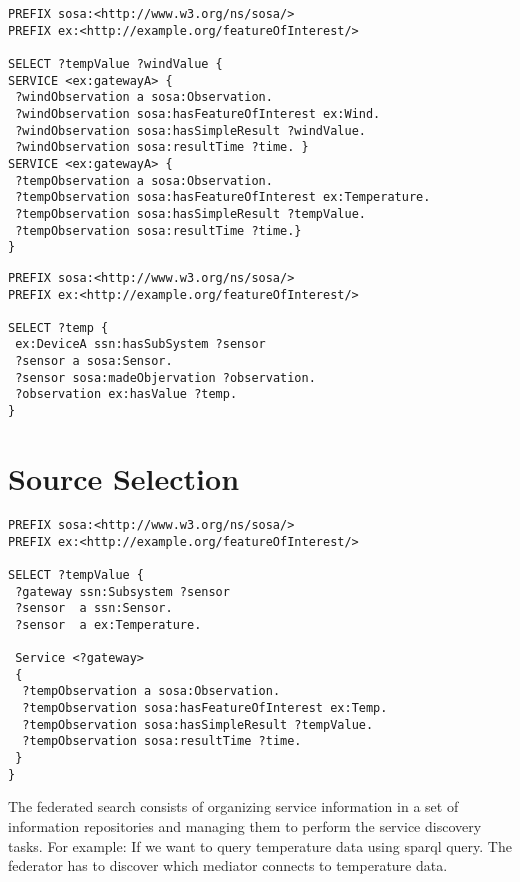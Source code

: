 \begin{lstlisting}[language=sparql,
  				   captionpos=b,
                   label={lst:TDexample},
                   caption={Federated SPARQL}]
PREFIX sosa:<http://www.w3.org/ns/sosa/>                   
PREFIX ex:<http://example.org/featureOfInterest/>  

SELECT ?tempValue ?windValue {
SERVICE <ex:gatewayA> {
 ?windObservation a sosa:Observation. 
 ?windObservation sosa:hasFeatureOfInterest ex:Wind.
 ?windObservation sosa:hasSimpleResult ?windValue.
 ?windObservation sosa:resultTime ?time. }
SERVICE <ex:gatewayA> {
 ?tempObservation a sosa:Observation.
 ?tempObservation sosa:hasFeatureOfInterest ex:Temperature.
 ?tempObservation sosa:hasSimpleResult ?tempValue.
 ?tempObservation sosa:resultTime ?time.}
}
\end{lstlisting}

\begin{lstlisting}[language=sparql,
  				   captionpos=b,
                   label={lst:TDexample},
                   caption={Federated SPARQL}]
PREFIX sosa:<http://www.w3.org/ns/sosa/>                   
PREFIX ex:<http://example.org/featureOfInterest/>  

SELECT ?temp {
 ex:DeviceA ssn:hasSubSystem ?sensor
 ?sensor a sosa:Sensor.
 ?sensor sosa:madeObjervation ?observation.
 ?observation ex:hasValue ?temp.
}
\end{lstlisting}


\section{Source Selection}


\begin{lstlisting}[language=sparql,
  				   captionpos=b,
                   label={lst:TDexample},
                   caption={Federated SPARQL}]
PREFIX sosa:<http://www.w3.org/ns/sosa/>                   
PREFIX ex:<http://example.org/featureOfInterest/>  

SELECT ?tempValue {
 ?gateway ssn:Subsystem ?sensor
 ?sensor  a ssn:Sensor.
 ?sensor  a ex:Temperature.
 
 Service <?gateway>
 {
  ?tempObservation a sosa:Observation.
  ?tempObservation sosa:hasFeatureOfInterest ex:Temp.
  ?tempObservation sosa:hasSimpleResult ?tempValue.
  ?tempObservation sosa:resultTime ?time.
 }
}
\end{lstlisting}



The federated search consists of organizing service information in a set of information repositories and managing them to perform the service discovery tasks.
For example: If we want to query temperature data using sparql query.
The federator has to discover which mediator connects to temperature data.


